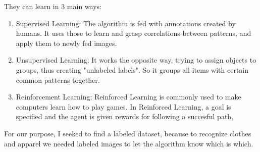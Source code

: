 They can learn in 3 main ways:
\begin{enumerate}
	\item Supervised Learning:
		The algorithm is fed with annotations created by humans. It uses those to learn and grasp correlations between patterns, and apply them to newly fed images.
	\item Unsupervised Learning:
		It works the opposite way, trying to assign objects to groups, thus creating "unlabeled labels". So it groups all items with certain common patterns together.
	\item Reinforcement Learning:
		Reinforced Learning is commonly used to make computers learn how to play games. In Reinforced Learning, a goal is specified and the agent is given rewards for following a succesful path,
\end{enumerate}
For our purpose, I seeked to find a labeled dataset, because to recognize clothes and apparel we needed labeled images to let the algorithm know which is which.

